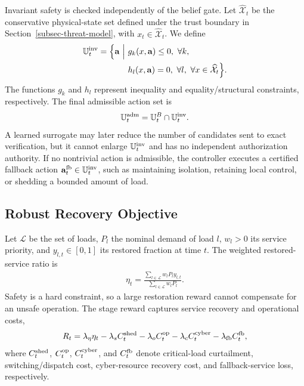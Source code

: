 Invariant safety is checked independently of the belief gate. Let $\widehat{\mathcal{X}}_t$ be the conservative physical-state set defined under the trust boundary in Section~\ref{subsec-threat-model}, with $x_t\in\widehat{\mathcal X}_t$. We define
\begin{align}
\label{eq-invariant-admissible-set}
\mathbb{U}^{\rm inv}_t=
\Big\{\mathbf{a}\ \Big|\
&g_k(x,\mathbf{a})\le0,\ \forall k,\\
&h_l(x,\mathbf{a})=0,\ \forall l,
\ \forall x\in\widehat{\mathcal{X}}_t
\Big\}.\nonumber
\end{align}
The functions $g_k$ and $h_l$ represent inequality and equality/structural constraints, respectively. The final admissible action set is
\begin{align}
\label{eq-final-admissible-set}
\mathbb{U}^{\rm adm}_t
=\mathbb{U}^{B}_t\cap\mathbb{U}^{\rm inv}_t.
\end{align}
A learned surrogate may later reduce the number of candidates sent to exact verification, but it cannot enlarge $\mathbb{U}^{\rm inv}_t$ and has no independent authorization authority. If no nontrivial action is admissible, the controller executes a certified fallback action $\mathbf{a}^{\rm fb}_t\in\mathbb{U}^{\rm inv}_t$, such as maintaining isolation, retaining local control, or shedding a bounded amount of load.

\subsection{Robust Recovery Objective}
\label{subsec-robust-objective}
Let $\mathcal{L}$ be the set of loads, $P_l$ the nominal demand of load $l$, $w_l>0$ its service priority, and $y_{l,t}\in[0,1]$ its restored fraction at time $t$. The weighted restored-service ratio is
\begin{align}
\label{eq-weighted-recovery-ratio}
\eta_t=
\frac{\sum_{l\in\mathcal{L}}w_lP_l y_{l,t}}
{\sum_{l\in\mathcal{L}}w_lP_l}.
\end{align}
Safety is a hard constraint, so a large restoration reward cannot compensate for an unsafe operation. The stage reward captures service recovery and operational costs,
\begin{align}
\label{eq-robust-reward}
R_t=
\lambda_{\eta}\eta_t
-\lambda_{s}C^{\rm shed}_t
-\lambda_{o}C^{\rm op}_t
-\lambda_{c}C^{\rm cyber}_t
-\lambda_{\rm fb}C^{\rm fb}_t,
\end{align}
where $C^{\rm shed}_t$, $C^{\rm op}_t$, $C^{\rm cyber}_t$, and $C^{\rm fb}_t$ denote critical-load curtailment, switching/dispatch cost, cyber-resource recovery cost, and fallback-service loss, respectively.

